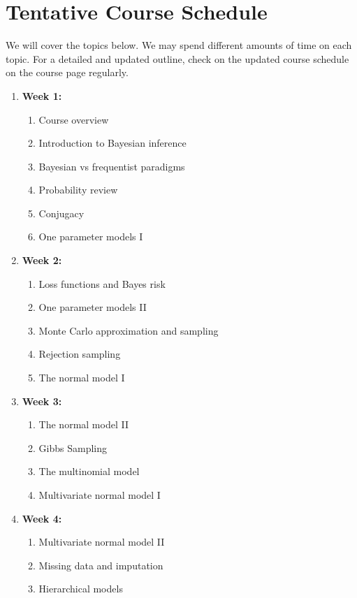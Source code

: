 \documentclass[11pt, a4paper]{article}
\begin{document}
\section{Tentative Course Schedule} 
We will cover the topics below. We may spend different amounts of time on each topic. For a detailed and updated outline, check on the updated course schedule on the course page regularly. 
\begin{enumerate}[label= {\color{darkblue}{\ArrowBoldRightStrobe}}]
	\item \textbf{Week 1: }
	\begin{enumerate}[label= {\color{cyan}{\Rectangle}}]
		\item Course overview
		\item Introduction to Bayesian inference
		\item Bayesian vs frequentist paradigms
		\item Probability review
		\item Conjugacy
		\item One parameter models I
	\end{enumerate}
	\item \textbf{Week 2: }
	\begin{enumerate}[label= {\color{cyan}{\Rectangle}}]
		\item Loss functions and Bayes risk
		\item One parameter models II
		\item Monte Carlo approximation and sampling
		\item Rejection sampling
		\item The normal model I
	\end{enumerate}
	\item \textbf{Week 3: }
	\begin{enumerate}[label= {\color{cyan}{\Rectangle}}]
		\item The normal model II
		\item Gibbs Sampling
		\item The multinomial model
		\item Multivariate normal model I
	\end{enumerate}
	\item \textbf{Week 4: }
	\begin{enumerate}[label= {\color{cyan}{\Rectangle}}]
		\item Multivariate normal model II
		\item Missing data and imputation
		\item Hierarchical models
	\end{enumerate}

\end{enumerate}
\end{document}
